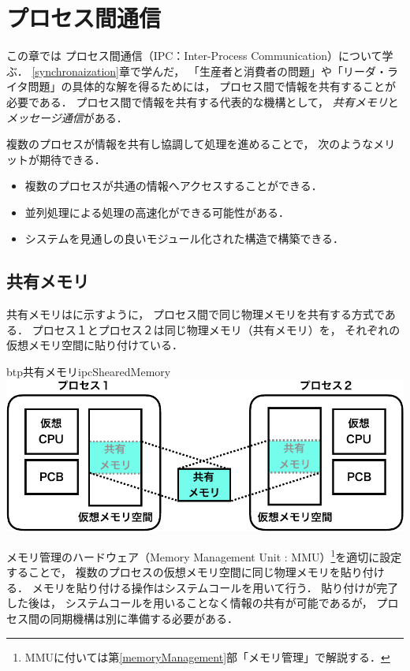 \chapter{プロセス間通信}
\label{interProcessCommunication}
この章では
プロセス間通信（IPC：Inter-Process Communication）について学ぶ．
\ref{synchronaization}章で学んだ，
「生産者と消費者の問題」や「リーダ・ライタ問題」の具体的な解を得るためには，
プロセス間で情報を共有することが必要である．
プロセス間で情報を共有する代表的な機構として，
\emph{共有メモリ}と\emph{メッセージ通信}がある．

複数のプロセスが情報を共有し協調して処理を進めることで，
次のようなメリットが期待できる．

\begin{itemize}
\item 複数のプロセスが共通の情報へアクセスすることができる．
\item 並列処理による処理の高速化ができる可能性がある．
\item システムを見通しの良いモジュール化された構造で構築できる．
\end{itemize}

\section{共有メモリ}
共有メモリはに示すように，
プロセス間で同じ物理メモリを共有する方式である．
プロセス１とプロセス２は同じ物理メモリ（共有メモリ）を，
それぞれの仮想メモリ空間に貼り付けている．

\begin{myfig}{btp}{共有メモリ}{ipcShearedMemory}
  \includegraphics[scale=0.6]{Fig/ipcShearedMemory-crop.pdf}
\end{myfig}

メモリ管理のハードウェア（Memory Management Unit : MMU）\footnote{
  MMUに付いては第\ref{memoryManagement}部「メモリ管理」で解説する．
}を適切に設定することで，
複数のプロセスの仮想メモリ空間に同じ物理メモリを貼り付ける．
メモリを貼り付ける操作はシステムコールを用いて行う．
貼り付けが完了した後は，
システムコールを用いることなく情報の共有が可能であるが，
プロセス間の同期機構は別に準備する必要がある．

